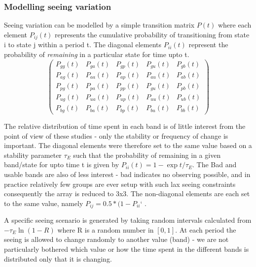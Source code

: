 \subsubsection{Modelling seeing variation}
Seeing variation can be modelled by a simple transition matrix $P(t)$ where each element $P_{ij}(t)$ represents the cumulative probability of transitioning from state i to state j within a period t. The diagonal elements $P_{ii}(t)$ represent the probability of \emph{remaining} in a particular state for time upto t. 
\begin{equation}
 \left( 
\begin{array}{ccccc}
  P_{gg}(t) & P_{ga}(t) & P_{gp}(t) & P_{gu}(t) & P_{gb}(t)\\
  P_{ag}(t) & P_{aa}(t) & P_{ap}(t) & P_{au}(t) & P_{ab}(t)\\
  P_{pg}(t) & P_{pa}(t) & P_{pp}(t) & P_{gu}(t) & P_{pb}(t)\\
  P_{ug}(t) & P_{ua}(t) & P_{up}(t) & P_{uu}(t) & P_{ub}(t)\\
  P_{bg}(t) & P_{ba}(t) & P_{bp}(t) & P_{bu}(t) & P_{bb}(t)

\end{array} 
\right)
\end{equation}

 The relative distribution of time spent in each band is of little interest from the point of view of these studies - only the stability or frequency of change is important.  The diagonal elements were therefore set to the same value based on a stability parameter $\tau_E$ such that the probability of remaining in a given band/state for upto time t is given by $P_{ii}(t) = 1 - \exp{t/\tau_E}$. The Bad and usable bands are also of less interest - bad indicates no observing possible, and in practice relatively few groups are ever setup with such lax seeing constraints consequently the array is reduced to 3x3. The non-diagonal elements are each set to the same value, namely $P_{ij} = 0.5*(1 - P_{ii}$` . 


A specific seeing scenario is generated by taking random intervals calculated from $-\tau_E \ln{(1-R)}$ where R is a random number in $[0,1]$. At each period the seeing is allowed to change randomly to another value (band) - we are not particularly bothered which value or how the time spent in the different bands is distributed only that it is changing.

